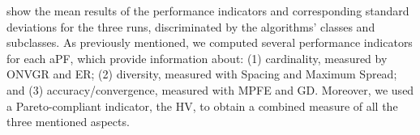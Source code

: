  show the mean results of the performance indicators and corresponding standard deviations for the three runs, discriminated by the algorithms' classes and subclasses. As previously mentioned, we computed several performance indicators for each \ac{aPF}, which provide information about: (1) cardinality, measured by \ac{ONVGR} and \ac{ER}; (2) diversity, measured with Spacing and Maximum Spread; and (3) accuracy/convergence, measured with \ac{MPFE} and \ac{GD}. Moreover, we used a Pareto-compliant indicator, the \ac{HV}, to obtain a combined measure of all the three mentioned aspects. %

